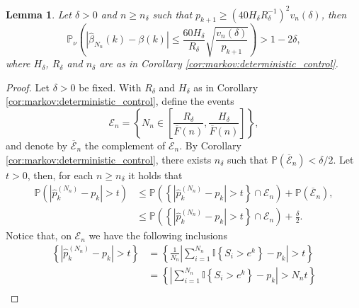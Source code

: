 \documentclass[sn-mathphys-ay]{sn-jnl}%
\newtheorem{lemma}{Lemma}[section]
\newcommand{\I}{\mathbb{I}}
\renewcommand{\P}{\mathbb{P}}
\begin{document}
\begin{appendices}
\begin{lemma}\label{lemma:markov:finite_bound}
    Let \(\delta>0\) and \(n\geq n_\delta\) such that \(p_{k+1}\geq {({40H_\delta}R^{-1}_\delta)}^2 v_n(\delta)\),
    then
    \begin{equation}\label{eq:markov:varianceBoundEq}
        \P_\nu \left( \left|\widehat{\beta}_{N_n}(k)-\beta(k)\right| \leq \frac{60 H_\delta}{R_{\delta}}\sqrt{\frac{v_n(\delta)}{p_{k+1}}} \right)>1-2\delta,
    \end{equation}
    where \(H_\delta\), \(R_\delta\) and \(n_\delta\) are as in Corollary \ref{cor:markov:deterministic_control}.
\end{lemma}
\begin{proof}
    Let \(\delta>0\) be fixed. With \(R_\delta\) and \(H_\delta\) as in Corollary \ref{cor:markov:deterministic_control}, define the events
    \begin{equation*}
        \mathcal{E}_n = \left\{ N_n \in \left[\frac{R_\delta}{\overline{F}(n)}, \frac{H_\delta}{\overline{F}(n)}\right] \right\},
    \end{equation*}
    and denote by \(\overline{\mathcal{E}}_n\) the complement of \(\mathcal{E}_n\).
    By Corollary \ref{cor:markov:deterministic_control}, there exists \(n_\delta\) such that
    \(\P(\overline{\mathcal{E}}_n)<\delta/2\). Let \(t>0\), then, for each \(n\geq n_\delta\) it
    holds that
    \begin{align*}
        \P\left( \left| \widehat{p}^{(N_n)}_k - p_k \right|>t \right) & \leqslant \P\left(\left\{\left| \widehat{p}^{(N_n)}_k - p_k \right|>t\right\}\cap \mathcal{E}_n\right) + \P\left(\overline{\mathcal{E}}_n\right), \\
                                                                      & \leqslant \P\left(\left\{\left| \widehat{p}^{(N_n)}_k - p_k \right|>t\right\}\cap \mathcal{E}_n\right) + \frac{\delta}{2}.
    \end{align*}
    Notice that, on \(\mathcal{E}_n\) we have the following inclusions
    \begin{align*}
        \left\{ \left| \widehat{p}^{(N_n)}_k - p_k \right|>t \right\} & = \left\{ \frac{1}{N_n} \left| \sum_{i=1}^{N_n}{\I\left\{ S_i>e^k \right\}} - p_k \right|>t \right\}                                     \nonumber                                                                \\
                                                                      & = \left\{ \left| \sum_{i=1}^{N_n}{\I\left\{ S_i>e^k \right\}} - p_k \right|>N_n t \right\}                                               \nonumber                                                                \\

\end{align*}
\end{proof}
\end{appendices}
\end{document}

